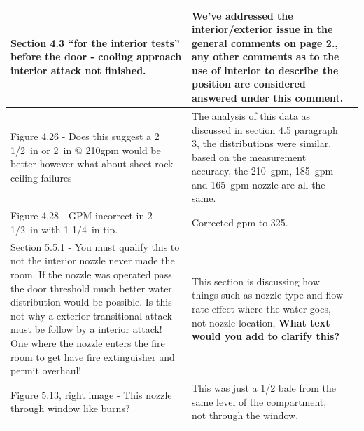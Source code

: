 \documentclass[12pt,oneside]{book}
\begin{document}
\begin{landscape}
\begin{longtable}{|L{4in}|L{3.75in}|c|}
		\hline 
		Section 4.3 ``for the interior tests'' before the door - cooling approach interior attack not finished. &
		We've addressed the interior/exterior issue in the general comments on page 2., any other comments as to the use of interior to describe the position are considered answered under this comment. & \\

		\hline
		Figure 4.26 - Does this suggest a 2 1/2~in or 2~in @ 210gpm would be better however what about sheet rock ceiling failures & 
		The analysis of this data as discussed in section 4.5 paragraph 3, the distributions were similar, based on the measurement accuracy, the 210~gpm, 185~gpm and 165~gpm nozzle are all the same.  & \\

		\hline
		Figure 4.28 - GPM incorrect in 2 1/2~in with 1 1/4~in tip. &
		Corrected gpm to 325. & \\

		\hline
		Section 5.5.1 - You must qualify this to not the interior nozzle never made the room. If the nozzle was operated pass the door threshold much better water distribution would be possible. Is this not why a exterior transitional attack must be follow by a interior attack! One where the nozzle enters the fire room to get have fire extinguisher and permit overhaul! &
		This section is discussing how things such as nozzle type and flow rate effect where the water goes, not nozzle location, \textbf{What text would you add to clarify this?} & \\

		\hline
		Figure 5.13, right image - This nozzle through window like burns? & 
		This was just a 1/2 bale from the same level of the compartment, not through the window. & \\


\end{longtable}
\end{landscape}
\end{document}
